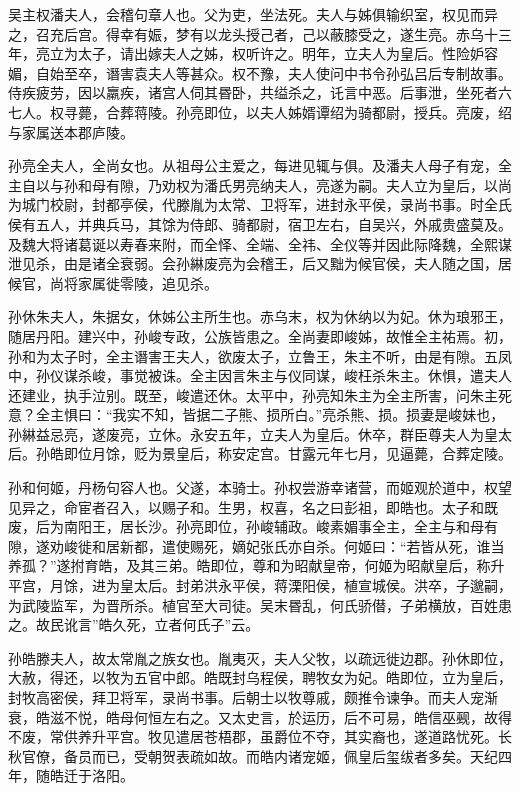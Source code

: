 \documentclass[12pt,UTF8]{ctexbook}
\begin{document}
吴主权潘夫人，会稽句章人也。父为吏，坐法死。夫人与姊俱输织室，权见而异之，召充后宫。得幸有娠，梦有以龙头授己者，己以蔽膝受之，遂生亮。赤乌十三年，亮立为太子，请出嫁夫人之姊，权听许之。明年，立夫人为皇后。性险妒容媚，自始至卒，谮害袁夫人等甚众。权不豫，夫人使问中书令孙弘吕后专制故事。侍疾疲劳，因以羸疾，诸宫人伺其昬卧，共缢杀之，讬言中恶。后事泄，坐死者六七人。权寻薨，合葬蒋陵。孙亮即位，以夫人姊婿谭绍为骑都尉，授兵。亮废，绍与家属送本郡庐陵。

孙亮全夫人，全尚女也。从祖母公主爱之，每进见辄与俱。及潘夫人母子有宠，全主自以与孙和母有隙，乃劝权为潘氏男亮纳夫人，亮遂为嗣。夫人立为皇后，以尚为城门校尉，封都亭侯，代滕胤为太常、卫将军，进封永平侯，录尚书事。时全氏侯有五人，并典兵马，其馀为侍郎、骑都尉，宿卫左右，自吴兴，外戚贵盛莫及。及魏大将诸葛诞以寿春来附，而全怿、全端、全祎、全仪等并因此际降魏，全熙谋泄见杀，由是诸全衰弱。会孙綝废亮为会稽王，后又黜为候官侯，夫人随之国，居候官，尚将家属徙零陵，追见杀。

孙休朱夫人，朱据女，休姊公主所生也。赤乌末，权为休纳以为妃。休为琅邪王，随居丹阳。建兴中，孙峻专政，公族皆患之。全尚妻即峻姊，故惟全主祐焉。初，孙和为太子时，全主谮害王夫人，欲废太子，立鲁王，朱主不听，由是有隙。五凤中，孙仪谋杀峻，事觉被诛。全主因言朱主与仪同谋，峻枉杀朱主。休惧，遣夫人还建业，执手泣别。既至，峻遣还休。太平中，孙亮知朱主为全主所害，问朱主死意？全主惧曰：“我实不知，皆据二子熊、损所白。”亮杀熊、损。损妻是峻妹也，孙綝益忌亮，遂废亮，立休。永安五年，立夫人为皇后。休卒，群臣尊夫人为皇太后。孙皓即位月馀，贬为景皇后，称安定宫。甘露元年七月，见逼薨，合葬定陵。

孙和何姬，丹杨句容人也。父遂，本骑士。孙权尝游幸诸营，而姬观於道中，权望见异之，命宦者召入，以赐子和。生男，权喜，名之曰彭祖，即皓也。太子和既废，后为南阳王，居长沙。孙亮即位，孙峻辅政。峻素媚事全主，全主与和母有隙，遂劝峻徙和居新都，遣使赐死，嫡妃张氏亦自杀。何姬曰：“若皆从死，谁当养孤？”遂拊育皓，及其三弟。皓即位，尊和为昭献皇帝，何姬为昭献皇后，称升平宫，月馀，进为皇太后。封弟洪永平侯，蒋溧阳侯，植宣城侯。洪卒，子邈嗣，为武陵监军，为晋所杀。植官至大司徒。吴末昬乱，何氏骄僣，子弟横放，百姓患之。故民讹言”皓久死，立者何氏子”云。

孙皓滕夫人，故太常胤之族女也。胤夷灭，夫人父牧，以疏远徙边郡。孙休即位，大赦，得还，以牧为五官中郎。皓既封乌程侯，聘牧女为妃。皓即位，立为皇后，封牧高密侯，拜卫将军，录尚书事。后朝士以牧尊戚，颇推令谏争。而夫人宠渐衰，皓滋不悦，皓母何恒左右之。又太史言，於运历，后不可易，皓信巫觋，故得不废，常供养升平宫。牧见遣居苍梧郡，虽爵位不夺，其实裔也，遂道路忧死。长秋官僚，备员而已，受朝贺表疏如故。而皓内诸宠姬，佩皇后玺绂者多矣。天纪四年，随皓迁于洛阳。
\end{document}
